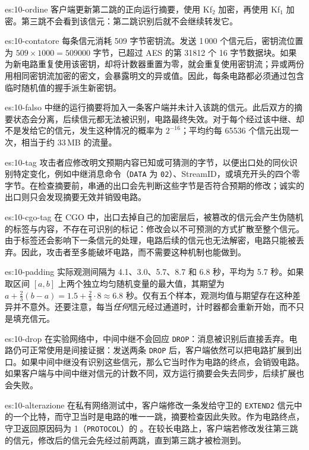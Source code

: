 \begin{soluzione}{es:10-ordine}
客户端更新第二跳的正向运行摘要，使用 Kf$_2$ 加密，再使用 Kf$_1$ 加密。第三跳不会看到该信元：第二跳识别后就不会继续转发它。
\end{soluzione}

\begin{soluzione}{es:10-contatore}
每条信元消耗 509 字节密钥流。发送 1\,000 个信元后，密钥流位置为 $509\times1000=\num{509000}$ 字节，已超过 AES 的第 \num{31812} 个 16 字节数据块。如果为新电路重复使用该密钥，却将计数器重置为零，就会重复使用密钥流；异或两份用相同密钥流加密的密文，会暴露明文的异或值。因此，每条电路都必须通过包含临时随机值的握手派生新密钥。
\end{soluzione}

\begin{soluzione}{es:10-falso}
中继的运行摘要将加入一条客户端并未计入该跳的信元。此后双方的摘要状态会分离，后续信元都无法被识别，电路最终失效。对于每个经过该中继、却不是发给它的信元，发生这种情况的概率为 $2^{-16}$；平均约每 \num{65536} 个信元出现一次，相当于约 33\,MB 的流量。
\end{soluzione}

\begin{soluzione}{es:10-tag}
攻击者应修改明文预期内容已知或可猜测的字节，以便出口处的同伙识别特定变化，例如中继消息命令（\texttt{DATA} 为 \texttt{02}）、StreamID，或填充开头的四个零字节。在检查摘要前，串通的出口会先判断这些字节是否符合预期的修改；诚实的出口则只会发现摘要无效并销毁电路。
\end{soluzione}

\begin{soluzione}{es:10-cgo-tag}
在 CGO 中，出口去掉自己的加密层后，被篡改的信元会产生伪随机的标签与内容，不存在可识别的标记：修改会以不可预测的方式扩散至整个信元。由于标签还会影响下一条信元的处理，电路后续的信元也无法解密，电路只能被丢弃。因此，攻击者至多能破坏电路，而不需要这种机制也能做到。
\end{soluzione}

\begin{soluzione}{es:10-padding}
实际观测间隔为 4.1、3.0、5.7、8.7 和 6.8 秒，平均为 5.7 秒。如果取区间 $[a,b]$ 上两个独立均匀随机变量的最大值，其期望为 $a+\tfrac{2}{3}(b-a)=1.5+\tfrac{2}{3}\cdot8\approx6.8$ 秒。仅有五个样本，观测均值与期望存在这种差异并不意外。还要注意，每当\emph{任何}信元经过通道时，计时器都会重新开始，而不只是填充信元。
\end{soluzione}

\begin{soluzione}{es:10-drop}
在实验网络中，中间中继不会回应 \texttt{DROP}：消息被识别后直接丢弃。电路仍可正常使用是间接证据：发送两条 \texttt{DROP} 后，客户端依然可以把电路扩展到出口。如果中间中继没有识别这些信元，那么它当时作为电路的终点，会销毁电路。如果客户端与中间中继对信元的计数不同，双方运行摘要会失去同步，后续扩展也会失败。
\end{soluzione}

\begin{soluzione}{es:10-alterazione}
在私有网络测试中，客户端修改一条发给守卫的 \texttt{EXTEND2} 信元中的一个比特，而守卫当时是电路的唯一一跳，摘要检查因此失败。作为电路终点，守卫返回原因码为 1（\texttt{PROTOCOL}）的 。在较长电路上，客户端若修改发往第三跳的信元，修改后的信元会先经过前两跳，直到第三跳才被检测到。
\end{soluzione}
